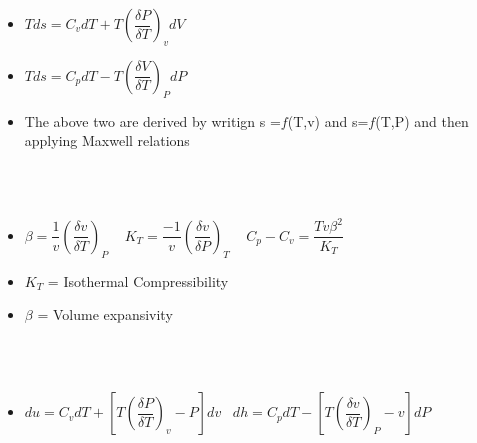 \documentclass[8pt]{article}
\begin{document}
	\begin{itemize}
		\item $\boxed{Tds = C_vdT + T\left(\dfrac{\delta P}{\delta T}\right)_vdV}$
		\item $\boxed{Tds = C_pdT - T\left(\dfrac{\delta V}{\delta T}\right)_PdP}$
		\item The above two are derived by writign s =$f$(T,v) and s=$f$(T,P) and then applying Maxwell relations
	\end{itemize}\hrulefill\\\\
	\begin{itemize}
		\item $\boxed{\beta = \dfrac{1}{v}\left(\dfrac{\delta v}{\delta T}\right)_P}\;\;\;$ $\boxed{K_T = \dfrac{-1}{v}\left(\dfrac{\delta v}{\delta P}\right)_T}\;\;\;$ $\boxed{C_p-C_v = \dfrac{Tv\beta^2}{K_T}}$
		\item $K_T$ = Isothermal Compressibility
		\item $\beta$ = Volume expansivity
	\end{itemize}\hrulefill\\\\
	\begin{itemize}
		\item $\boxed{du = C_vdT + \left[T\left(\dfrac{\delta P}{\delta T}\right)_v-P\right]dv}\;\;\; \boxed{dh = C_pdT - \left[T\left(\dfrac{\delta v}{\delta T}\right)_P-v\right]dP}$
	\end{itemize}\hrulefill\\\\
\end{document}
